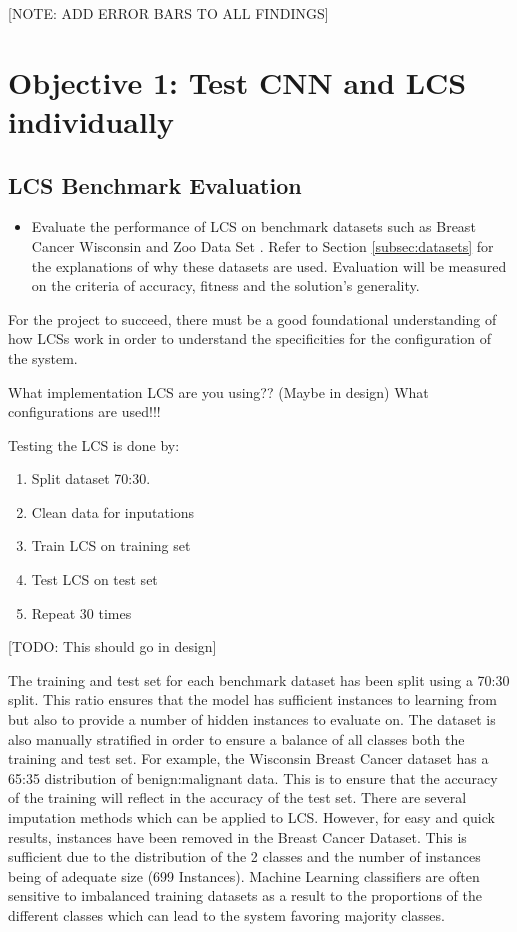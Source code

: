 [NOTE: ADD ERROR BARS TO ALL FINDINGS]
\section{Objective 1: Test CNN and LCS individually}
\subsection{LCS Benchmark Evaluation} \label{subsec:bench}
\begin{itemize}
	\item Evaluate the performance of LCS on benchmark datasets such as Breast Cancer
	Wisconsin \cite{wisconsinbreast} and Zoo Data Set \cite{zoodata}. Refer to Section \ref{subsec:datasets} for the explanations of why these datasets are used. Evaluation will be measured on the criteria of
	accuracy, fitness and the solution’s generality.
\end{itemize}

For the project to succeed, there must be a good foundational understanding of how LCSs work in order to understand the specificities for the configuration of the system. 

What implementation LCS are you using?? (Maybe in design)
What configurations are used!!!

Testing the LCS is done by:
\begin{enumerate}
	\item Split dataset 70:30. 
	\item Clean data for inputations
	\item Train LCS on training set
	\item Test LCS on test set
	\item Repeat 30 times
\end{enumerate}

[TODO: This should go in design]

The training and test set for each benchmark dataset has been split using a 70:30 split. This ratio ensures that the model has sufficient instances to learning from but also to provide a number of hidden instances to evaluate on. The dataset is also manually stratified in order to ensure a balance of all classes both the training and test set. For example, the Wisconsin Breast Cancer dataset has a 65:35 distribution of benign:malignant data. This is to ensure that the accuracy of the training will reflect in the accuracy of the test set. There are several imputation methods which can be applied to LCS. However, for easy and quick results, instances have been removed in the Breast Cancer Dataset. This is sufficient due to the distribution of the 2 classes and the number of instances being of adequate size (699 Instances).  Machine Learning classifiers are often sensitive to imbalanced training datasets as a result to the proportions of the different classes which can lead to the system favoring majority classes. 


